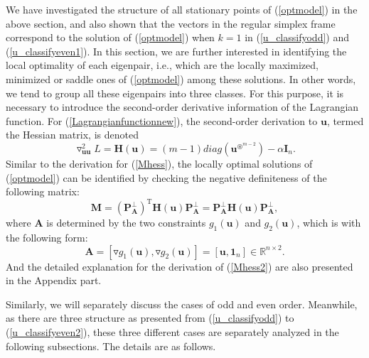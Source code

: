 We have investigated the  structure of all  stationary points of  (\ref{optmodel})  in the above section,
and also shown that 
the vectors in the regular simplex frame 
correspond to 
the solution  of (\ref{optmodel}) when $k=1$  in (\ref{u_classifyodd})  and (\ref{u_classifyeven1}). 
In this section,  we are further interested in identifying  the local optimality of each eigenpair, 
i.e., 
which    are   the  locally  maximized,  minimized or saddle    ones  of (\ref{optmodel})
among    these  solutions.
In other words, we tend to   group 
all these eigenpairs into three classes. 
For this purpose,    it is necessary to   introduce the second-order
derivative information 
of  the  Lagrangian function.      
For  (\ref{Lagrangianfunctionnew}),   the second-order derivation  to    $ \mathbf u $, termed  the Hessian matrix,  is   denoted
\begin{equation}\label{Hessianmatrix}
\triangledown_{\mathbf u\mathbf u}^{2} L
= \mathbf H (\mathbf u)  
=(m-1) diag (\mathbf u ^{\circledast^{m-2}})
-\alpha \mathbf  I_{n}  .
\end{equation}
Similar to 
the  derivation for (\ref{Mhess}),
the 
locally    optimal   solutions of   (\ref{optmodel})
can  be  identified  by
checking the  negative 
definiteness of the  following  matrix:
\begin{equation}\label{Mhess2} 
\mathbf {M} =
(\mathbf  P_{\mathbf  A } ^{\bot})^{\mathrm T}    \mathbf H (\mathbf u)  \mathbf  P_{\mathbf  A }^{\bot}
=
\mathbf  P_{\mathbf  A } ^{\bot}   \mathbf H (\mathbf u)  \mathbf  P_{\mathbf  A }^{\bot}
,
\end{equation} 
where 
$ \mathbf A $
is determined by
the 
two constraints 
$  g_{1}(\mathbf u) $ and  $ g_{2}(\mathbf u) $,
which 
is with the  following form:
\begin{equation}
\label{Aform}
\mathbf A =  [\triangledown  g_{1}(\mathbf u) , \triangledown  g_{2}(\mathbf u) ] =
[\mathbf u, \mathbf 1_{n}]  \in   \mathbb R^{n  \times 2 } .
\end{equation}
And the  detailed  explanation for  the  
derivation of 
(\ref{Mhess2})
are also  presented in  the Appendix part. 



Similarly,
we will separately discuss the cases of odd and even order.
Meanwhile, 
as there are three structure as presented 
from  
	(\ref{u_classifyodd})
to
(\ref{u_classifyeven2}),
these   three different cases are 
separately analyzed in the following subsections.
The details are as follows.

